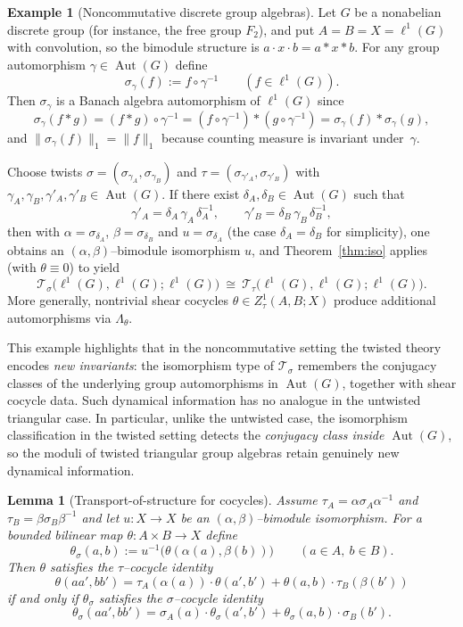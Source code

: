 \documentclass{article}
\theoremstyle{plain}
\newtheorem{lemma}[theorem]{Lemma}
\theoremstyle{definition}
\newtheorem{example}[theorem]{Example}
\newcommand{\T}{\mathcal{T}}
\newcommand{\Aut}{\operatorname{Aut}}
\begin{document}
\begin{example}[Noncommutative discrete group algebras]\label{ex:L1G}
Let $G$ be a nonabelian discrete group (for instance, the free group $F_2$), and put 
$A=B=X=\ell^1(G)$ with convolution, so the bimodule structure is 
$a\cdot x\cdot b=a*x*b$. 
For any group automorphism $\gamma\in\Aut(G)$ define
\[
\sigma_\gamma(f):=f\circ\gamma^{-1}\qquad(f\in \ell^1(G)).
\]
Then $\sigma_\gamma$ is a Banach algebra automorphism of $\ell^1(G)$ since
\[
\sigma_\gamma(f*g)=(f*g)\circ\gamma^{-1}
=(f\circ\gamma^{-1})*(g\circ\gamma^{-1})
=\sigma_\gamma(f)*\sigma_\gamma(g),
\]
and $\|\sigma_\gamma(f)\|_1=\|f\|_1$ because counting measure is invariant under~$\gamma$.

Choose twists $\sigma=(\sigma_{\gamma_A},\sigma_{\gamma_B})$ and 
$\tau=(\sigma_{\gamma'_A},\sigma_{\gamma'_B})$ with 
$\gamma_A,\gamma_B,\gamma'_A,\gamma'_B\in\Aut(G)$. 
If there exist $\delta_A,\delta_B\in\Aut(G)$ such that
\[
\gamma'_A=\delta_A\,\gamma_A\,\delta_A^{-1},
\qquad
\gamma'_B=\delta_B\,\gamma_B\,\delta_B^{-1},
\]
then with $\alpha=\sigma_{\delta_A}$, $\beta=\sigma_{\delta_B}$ and $u=\sigma_{\delta_A}$ 
(the case $\delta_A=\delta_B$ for simplicity), one obtains an 
$(\alpha,\beta)$--bimodule isomorphism $u$, and Theorem~\ref{thm:iso} 
applies (with $\theta\equiv 0$) to yield
\[
\T_\sigma\bigl(\ell^1(G),\ell^1(G);\ell^1(G)\bigr)
\ \cong\
\T_\tau\bigl(\ell^1(G),\ell^1(G);\ell^1(G)\bigr).
\]
More generally, nontrivial shear cocycles 
$\theta\in Z^1_\tau(A,B;X)$ produce additional automorphisms via $\Lambda_\theta$. 

This example highlights that in the noncommutative setting the twisted theory encodes 
\emph{new invariants}: the isomorphism type of $\T_\sigma$ remembers the conjugacy 
classes of the underlying group automorphisms in $\Aut(G)$, together with shear 
cocycle data. Such dynamical information has no analogue in the untwisted triangular case.
In particular, unlike the untwisted case, the isomorphism classification in the
twisted setting detects the \emph{conjugacy class inside $\Aut(G)$}, so the
moduli of twisted triangular group algebras retain genuinely new dynamical
information.

\end{example}


\begin{lemma}[Transport-of-structure for cocycles]\label{lem:transport}
Assume $\tau_A=\alpha\sigma_A\alpha^{-1}$ and $\tau_B=\beta\sigma_B\beta^{-1}$ and let
$u:X\to X$ be an $(\alpha,\beta)$--bimodule isomorphism. For a bounded bilinear map
$\theta:A\times B\to X$ define
\[
\theta_\sigma(a,b):=u^{-1}\bigl(\theta(\alpha(a),\beta(b))\bigr)\qquad(a\in A,\ b\in B).
\]
Then $\theta$ satisfies the $\tau$--cocycle identity
\[
\theta(aa',bb')=\tau_A(\alpha(a))\cdot\theta(a',b')+\theta(a,b)\cdot\tau_B(\beta(b'))
\]
if and only if $\theta_\sigma$ satisfies the $\sigma$--cocycle identity
\[
\theta_\sigma(aa',bb')=\sigma_A(a)\cdot\theta_\sigma(a',b')+\theta_\sigma(a,b)\cdot\sigma_B(b').
\]
\end{lemma}
\end{document}
